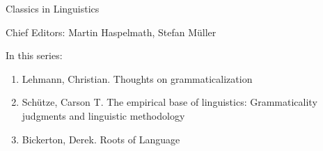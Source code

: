 {\large Classics in Linguistics}

\bigskip

Chief Editors: Martin Haspelmath, Stefan Müller

\bigskip

In this series:

\begin{enumerate}
\item Lehmann, Christian. Thoughts on grammaticalization
\item Schütze, Carson T. The empirical base of linguistics: Grammaticality judgments and linguistic methodology
\item Bickerton, Derek. Roots of Language
\end{enumerate}


\vfill

